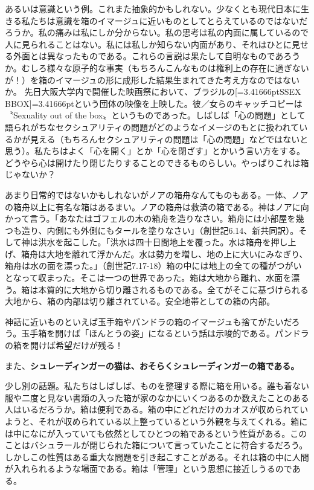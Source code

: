 \documentclass[b5j,twoside,twocolumn]{utarticle}
\begin{document}
あるいは意識という例。これまた抽象的かもしれない。少なくとも現代日本に生きる私たちは意識を箱のイマージュに近いものとしてとらえているのではないだろうか。私の痛みは私にしか分からない。私の思考は私の内面に属しているので人に見られることはない。私には私しか知らない内面があり、それはひとに見せる外面とは異なったものである。これらの言説は果たして自明なものであろうか。むしろ様々な原子的な事実（もちろんこんなものは権利上の存在に過ぎないが！）を箱のイマージュの形に成形した結果生まれてきた考え方なのではないか。 先日大阪大学内で開催した映画祭において、ブラジルの\tbaselineshift=2.5pt[\tbaselineshift=3.41666ptSSEX BBOX\tbaselineshift=2.5pt]\tbaselineshift=3.41666ptという団体の映像を上映した。彼／女らのキャッチコピーは〝Sexuality out of the box〟というものであった。しばしば「心の問題」として語られがちなセクシュアリティの問題がどのようなイメージのもとに扱われているかが見える（もちろんセクシュアリティの問題は「心の問題」などではないと思う）。私たちはよく「心を開く」とか「心を閉ざす」とかいう言い方をする。どうやら心は開けたり閉じたりすることのできるものらしい。やっぱりこれは箱じゃないか？


あまり日常的ではないかもしれないがノアの箱舟なんてものもある。一体、ノアの箱舟以上に有名な箱はあるまい。ノアの箱舟は救済の箱である。神はノアに向かって言う。「あなたはゴフェルの木の箱舟を造りなさい。箱舟には小部屋を幾つも造り、内側にも外側にもタールを塗りなさい」（創世記6.14、新共同訳）。そして神は洪水を起こした。「洪水は四十日間地上を覆った。水は箱舟を押し上げ、箱舟は大地を離れて浮かんだ。水は勢力を増し、地の上に大いにみなぎり、箱舟は水の面を漂った。」（創世記7.17-18）箱の中には地上の全ての種がつがいとなって収まった。そこは一つの世界であった。箱は大地から離れ、水面を漂う。箱は本質的に大地から切り離されるものである。全てがそこに基づけられる大地から、箱の内部は切り離されている。安全地帯としての箱の内部。


神話に近いものといえば玉手箱やパンドラの箱のイマージュも捨てがたいだろう。玉手箱を開けば「ほんとうの姿」になるという話は示唆的である。パンドラの箱を開けば希望だけが残る！


また、\textbf{シュレーディンガーの猫は、おそらくシュレーディンガーの箱である。}


少し別の話題。私たちはしばしば、ものを整理する際に箱を用いる。誰も着ない服や二度と見ない書類の入った箱が家のなかにいくつあるのか数えたことのある人はいるだろうか。箱は便利である。箱の中にどれだけのカオスが収められていようと、それが収められている以上整っているという外観を与えてくれる。箱には中になにが入っていても依然としてひとつの箱であるという性質がある。このことはバシュラールが閉じられた箱について言っていたことに符合するだろう。しかしこの性質はある重大な問題を引き起こすことがある。それは箱の中に人間が入れられるような場面である。箱は「管理」という思想に接近しうるのである。
\end{document}
